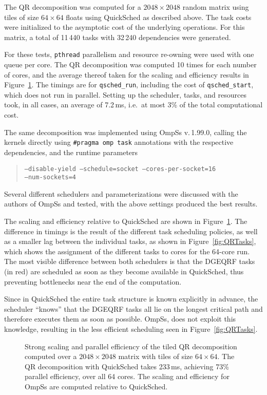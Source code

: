 \documentclass[fleqn,10pt]{wlpeerj}
\newcommand{\fig}[1]
    {Figure~\ref{fig:#1}}
\begin{document}
The QR decomposition was computed for a $2048\times 2048$
random matrix using tiles of size $64\times 64$ floats using QuickSched
as described above.
The task costs were initialized to the asymptotic cost of the underlying
operations.
For this matrix, a total of 11\,440 tasks with 32\,240 dependencies
were generated.

For these tests, {\tt pthread} parallelism and resource re-owning
were used with one queue per core.
The QR decomposition was computed 10 times for each number of
cores, and the average thereof taken for the scaling and
efficiency results in \fig{QRResults}.
The timings are for {\tt qsched\_run}, including the cost of
{\tt qsched\_start}, which does not run in parallel.
Setting up the scheduler, tasks, and resources took, in all
cases, an average of 7.2\,ms, i.e.~at most 3\% of the total
computational cost.

The same decomposition was implemented using OmpSs v.\,1.99.0,
calling the kernels directly using {\tt \#pragma omp task}
annotations with the respective dependencies, and
the runtime parameters
\begin{quote}
  \tt --disable-yield --schedule=socket --cores-per-socket=16 \\--num-sockets=4
\end{quote}
\noindent Several different schedulers and parameterizations
were discussed with the authors of OmpSs and tested, with
the above settings produced the best results.

The scaling and efficiency relative to QuickSched are 
shown in \fig{QRResults}.
The difference in timings is the result of the different
task scheduling policies, as well as a smaller lag between the
individual tasks, as shown in \fig{QRTasks},
which shows the assignment of the different tasks to cores for the
64-core run.
The most visible difference between both schedulers is that
the DGEQRF tasks (in red) are scheduled as soon as they
become available in QuickSched, thus preventing bottlenecks
near the end of the computation.

Since in QuickSched the entire task structure is known explicitly
in advance, the scheduler ``knows'' that the DGEQRF tasks all
lie on the longest critical path and therefore executes them as
soon as possible.
OmpSs, does not exploit this knowledge, resulting in the less efficient
scheduling seen in \fig{QRTasks}.

\begin{figure}
    \centerline{}
    \caption{Strong scaling and parallel efficiency of the tiled QR decomposition
        computed over a $2048\times 2048$ matrix with tiles of size
        $64\times 64$.
        The QR decomposition with QuickSched takes 233\,ms,
        achieving 73\% parallel efficiency, over all 64 cores.
        The scaling and efficiency for OmpSs are computed relative to QuickSched.
        }
    \label{fig:QRResults}
\end{figure}
\end{document}
